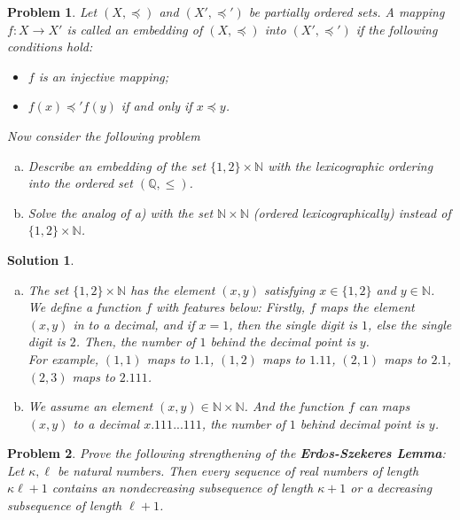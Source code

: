 \documentclass[12pt]{article}
\newtheorem*{solution}{Solution}
\newtheorem{hw}{Problem}
\begin{document}
\begin{hw}
Let $(X,\preceq)$ and $(X',\preceq')$ be partially ordered sets. A mapping $f:X\rightarrow X'$ is called an embedding of $(X,\preceq)$ into $(X',\preceq')$ if the following conditions hold:
\begin{itemize}
  \item $f$ is an injective mapping;
  \item $f(x)\preceq' f(y)$ if and only if $x\preceq y$.
\end{itemize}

Now consider the following problem

\begin{enumerate}[a)]
  \item Describe an embedding of the set $\{1,2\}\times \mathbb{N}$ with the lexicographic ordering into the ordered set $(\mathbb{Q},\leq)$.
  \item Solve the analog of a) with the set $\mathbb{N}\times \mathbb{N}$ (ordered lexicographically) instead of $\{1,2\}\times \mathbb{N}$.
 \end{enumerate}

 \end{hw}
 
 \begin{solution}
    \begin{enumerate}[a)]
        \item The set $\{1,2\}\times \mathbb{N}$ has the element $(x,y)$ satisfying $x\in \{1,2\}$ and $y\in \mathbb{N}$.
        We define a function $f$ with features below: Firstly, $f$ maps the element $(x,y)$ in to a decimal, and if $x=1$, then the single digit is $1$, else the single digit is $2$. Then, the number of $1$ behind the decimal point is $y$. 
        \\For example, $(1,1)$ maps to $1.1$, $(1,2)$ maps to $1.11$, $(2,1)$ maps to $2.1$, $(2,3)$ maps to $2.111$.
        \item We assume an element $(x,y) \in \mathbb{N}\times \mathbb{N}$. And the function $f$ can maps $(x,y)$ to a decimal $x.111...111$, the number of $1$ behind decimal point is $y$.
    \end{enumerate}
\end{solution}

 \begin{hw}
 Prove the following strengthening of the \textbf{Erd$\ddot{o}$s-Szekeres Lemma}: Let $\kappa,\ell$ be natural numbers. Then every sequence of real numbers of length $\kappa\ell+1$ contains an nondecreasing subsequence of length $\kappa+1$ or a decreasing subsequence of length $\ell+1$.
 \end{hw}
\end{document}
